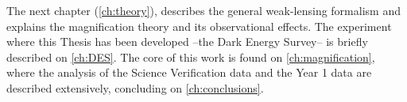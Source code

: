 The next chapter (\autoref{ch:theory}), describes the general weak-lensing formalism and explains the magnification theory and its observational effects. The experiment where this Thesis has been developed --the Dark Energy Survey-- is briefly described on \autoref{ch:DES}. The core of this work is found on \autoref{ch:magnification}, where the analysis of the Science Verification data and the Year 1 data are described extensively, concluding on \autoref{ch:conclusions}.
